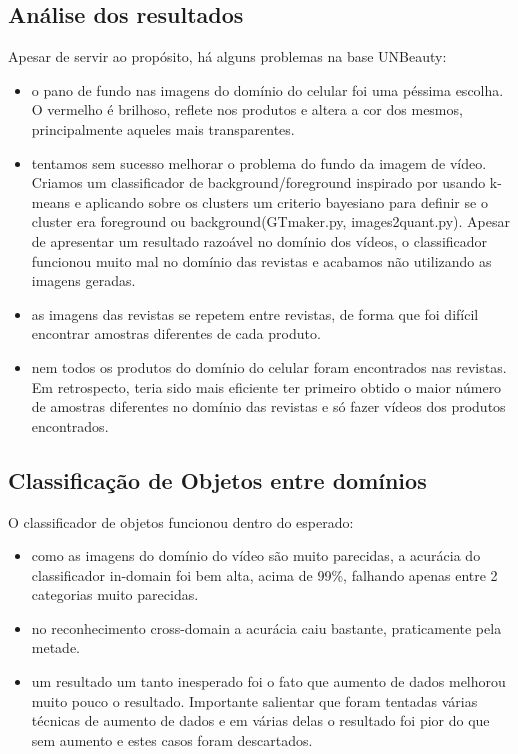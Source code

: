 \documentclass[conference]{IEEEtran}
\begin{document}
\subsection{Análise dos resultados}

Apesar de servir ao propósito, há alguns problemas na base UNBeauty:
\begin{itemize}
\item o pano de fundo nas imagens do domínio do celular foi uma péssima escolha.  O vermelho é brilhoso, reflete nos produtos e altera a cor dos mesmos, principalmente aqueles mais transparentes. 
\item tentamos sem sucesso melhorar o problema do fundo da imagem de vídeo.  Criamos um classificador de background/foreground inspirado por \cite{ribeiro} usando k-means e aplicando sobre os clusters um criterio bayesiano para definir se o cluster era foreground ou background(GTmaker.py, images2quant.py). Apesar de apresentar um resultado razoável no domínio dos vídeos, o classificador funcionou muito mal no domínio das revistas e acabamos não utilizando as imagens geradas.
\item as imagens das revistas se repetem entre revistas, de forma que foi difícil encontrar amostras diferentes de cada produto.
\item nem todos os produtos do domínio do celular foram encontrados nas revistas. Em retrospecto, teria sido mais eficiente ter primeiro obtido o maior número de amostras diferentes no domínio das revistas e só fazer vídeos dos produtos encontrados. 
\end{itemize}
\subsection{Classificação de Objetos entre domínios}
O classificador de objetos funcionou dentro do esperado:
\begin{itemize}
\item como as imagens do domínio do vídeo são muito parecidas, a acurácia do classificador in-domain foi bem alta, acima de 99\%, falhando apenas entre 2 categorias muito parecidas.
\item no reconhecimento cross-domain a acurácia caiu bastante, praticamente pela metade.
\item um resultado um tanto inesperado foi o fato que aumento de dados melhorou muito pouco o resultado.  Importante salientar que foram tentadas várias técnicas de aumento de dados e em várias delas o resultado foi pior do que sem aumento e estes casos foram descartados.
\end{itemize}
\end{document}
